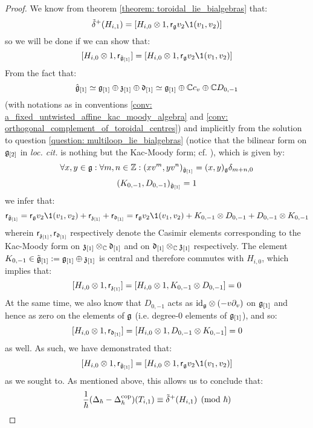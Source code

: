 \begin{proof}
                We know from theorem \ref{theorem: toroidal_lie_bialgebras} that:
                    $$\tilde{\delta}^+(H_{i, 1}) = [ H_{i, 0} \tensor 1, \sfr_{\g} v_2 \1(v_1, v_2) ]$$
                so we will be done if we can show that:
                    $$[H_{i, 0} \tensor 1, \sfr_{ \hat{\g}_{[1]} }] = [ H_{i, 0} \tensor 1, \sfr_{\g} v_2 \1(v_1, v_2) ]$$
                From the fact that:
                    $$\hat{\mathfrak{g}}_{[1]} \simeq \mathfrak{g}_{[1]} \oplus \mathfrak{z}_{[1]} \oplus \mathfrak{d}_{[1]} \simeq \mathfrak{g}_{[1]} \oplus \mathbb{C} c_v \oplus \mathbb{C} D_{0, -1}$$
                (with notations as in conventions \ref{conv: a_fixed_untwisted_affine_kac_moody_algebra} and \ref{conv: orthogonal_complement_of_toroidal_centres}) and implicitly from the solution to question \ref{question: multiloop_lie_bialgebras} (notice that the bilinear form on $\mathfrak{g}_{[2]}$ in \textit{loc. cit.} is nothing but the Kac-Moody form; cf. \cite[Chapter 7]{kac_infinite_dimensional_lie_algebras}), which is given by:
                    $$\forall x, y \in \mathfrak{g}: \forall m, n \in \mathbb{Z}: (x v^m, y v^n)_{\hat{\mathfrak{g}}_{[1]}} = (x, y)_{\mathfrak{g}} \delta_{m + n, 0}$$
                    $$(K_{0, -1}, D_{0, -1})_{\hat{\mathfrak{g}}_{[1]}} = 1$$
                we infer that:
                    $$\sfr_{ \hat{\g}_{[1]} } = \sfr_{\g} v_2 \1(v_1, v_2) + \sfr_{\z_{[1]}} + \sfr_{\d_{[1]}} = \sfr_{\g} v_2 \1(v_1, v_2) + K_{0, -1} \tensor D_{0, -1} + D_{0, -1} \tensor K_{0, -1}$$
                wherein $\mathsf{r}_{\mathfrak{z}_{[1]}}, \mathsf{r}_{\mathfrak{d}_{[1]}}$ respectively denote the Casimir elements corresponding to the Kac-Moody form on $\z_{[1]} \tensor_{\bbC} \d_{[1]}$ and on $\d_{[1]} \tensor_{\bbC} \z_{[1]}$ respectively. The element $K_{0, -1} \in \tilde{\mathfrak{g}}_{[1]} := \mathfrak{g}_{[1]} \oplus \mathfrak{z}_{[1]}$ is central and therefore commutes with $H_{i, 0}$, which implies that:
                    $$[H_{i, 0} \tensor 1, \sfr_{\z_{[1]}}] = [H_{i, 0} \tensor 1, K_{0, -1} \tensor D_{0, -1}] = 0$$
                At the same time, we also know that $D_{0, -1}$ acts as $\id_{\g} \tensor (-v \del_v)$ on $\mathfrak{g}_{[1]}$ and hence as zero on the elements of $\mathfrak{g}$ (i.e. degree-$0$ elements of $\mathfrak{g}_{[1]}$), and so:
                    $$[H_{i, 0} \tensor 1, \sfr_{\d_{[1]}}] = [H_{i, 0} \tensor 1, D_{0, -1} \tensor K_{0, -1}] = 0$$
                as well. As such, we have demonstrated that:
                    $$[H_{i, 0} \tensor 1, \sfr_{ \hat{\g}_{[1]} }] = [ H_{i, 0} \tensor 1, \sfr_{\g} v_2 \1(v_1, v_2) ]$$
                as we sought to. As mentioned above, this allows us to conclude that:
                    $$\frac{1}{\hbar}( \Delta_{\hbar} - \Delta_{\hbar}^{\mathrm{cop}} )(T_{i, 1}) \equiv \tilde{\delta}^+(H_{i, 1}) \pmod{\hbar}$$
            \end{proof}
    
    \printbibliography

